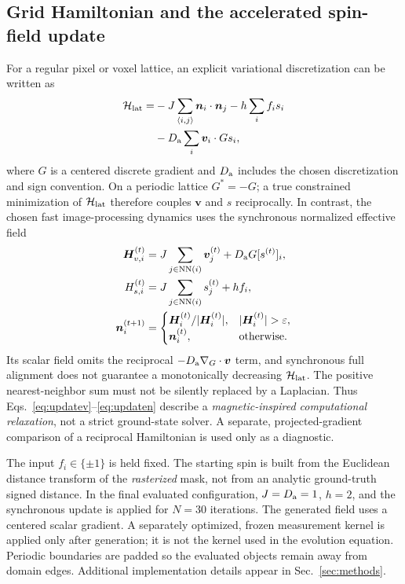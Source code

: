 \documentclass[11pt,a4paper]{article}
\newcommand{\nn}{\bm n}
\newcommand{\vv}{\bm v}
\newcommand{\Ham}{\mathcal H}
\begin{document}
\subsection{Grid Hamiltonian and the accelerated spin-field update}\label{subsec:impl:algorithm}
For a regular pixel or voxel lattice, an explicit variational discretization can be written as
\begin{equation}
\begin{split}
 \Ham_{\rm lat}=&-J\sum_{\langle i,j\rangle}\nn_i\cdot\nn_j-h\sum_i f_i s_i\\
 &-D_{\rm a}\sum_i \vv_i\cdot Gs_i,
\end{split}
\label{eq:Hgrid}
\end{equation}
where \(G\) is a centered discrete gradient and \(D_{\rm a}\) includes the chosen discretization and sign convention. On a periodic lattice \(G^*=-G\); a true constrained minimization of \(\Ham_{\rm lat}\) therefore couples \(\vv\) and \(s\) reciprocally. In contrast, the chosen fast image-processing dynamics uses the synchronous normalized effective field
\begin{align}
 \bm H_{v,i}^{(t)}&=J\sum_{j\in\mathrm{NN}(i)}\vv_j^{(t)}+D_{\rm a}G[s^{(t)}]_i,
 \label{eq:updatev}\\
 H_{s,i}^{(t)}&=J\sum_{j\in\mathrm{NN}(i)}s_j^{(t)}+h f_i,
 \label{eq:updates}\\
 \nn_i^{(t+1)}&=\begin{cases}\bm H_i^{(t)}/|\bm H_i^{(t)}|,&|\bm H_i^{(t)}|>\varepsilon,\\\nn_i^{(t)},&\text{otherwise.}\end{cases}
 \label{eq:updaten}
\end{align}
Its scalar field omits the reciprocal \(-D_{\rm a}\nabla_G\cdot\vv\) term, and synchronous full alignment does not guarantee a monotonically decreasing \(\Ham_{\rm lat}\). The positive nearest-neighbor sum must not be silently replaced by a Laplacian. Thus Eqs.~\eqref{eq:updatev}--\eqref{eq:updaten} describe a \emph{magnetic-inspired computational relaxation}, not a strict ground-state solver. A separate, projected-gradient comparison of a reciprocal Hamiltonian is used only as a diagnostic.

The input \(f_i\in\{\pm1\}\) is held fixed. The starting spin is built from the Euclidean distance transform of the \emph{rasterized} mask, not from an analytic ground-truth signed distance. In the final evaluated configuration, \(J=D_{\rm a}=1\), \(h=2\), and the synchronous update is applied for \(N=30\) iterations. The generated field uses a centered scalar gradient. A separately optimized, frozen measurement kernel is applied only after generation; it is not the kernel used in the evolution equation. Periodic boundaries are padded so the evaluated objects remain away from domain edges. Additional implementation details appear in Sec.~\ref{sec:methods}.
\end{document}
